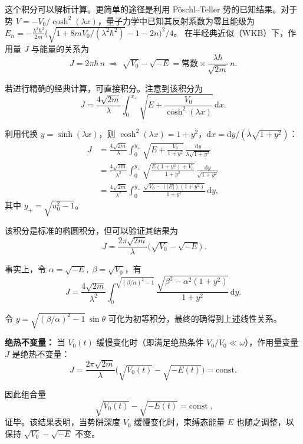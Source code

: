 \begin{question}
\begin{solution}
这个积分可以解析计算。更简单的途径是利用 P\"oschl--Teller 势的已知结果。对于势
\(V=-V_0/\cosh^2(\lambda x)\)，量子力学中已知其反射系数为零且能级为
\(E_n=-\frac{\lambda^2\hbar^2}{2m}\bigl(\sqrt{1+8mV_0/(\lambda^2\hbar^2)}-1-2n\bigr)^2/4\)。
在半经典近似（WKB）下，作用量 \(J\) 与能量的关系为
\[
J=2\pi\hbar\,n\;\Longrightarrow\;
\sqrt{V_0}-\sqrt{-E}=\text{常数}\times\frac{\lambda\hbar}{\sqrt{2m}}\,n .
\]

若进行精确的经典计算，可直接积分。注意到该积分为
\[
J=\frac{4\sqrt{2m}}{\lambda}\int_0^{x_+}\sqrt{E+\frac{V_0}{\cosh^2(\lambda x)}}\,\mathrm dx .
\]

利用代换 \(y=\sinh(\lambda x)\)，则 \(\cosh^2(\lambda x)=1+y^2\)，\(\mathrm dx=\mathrm dy/(\lambda\sqrt{1+y^2})\)：
\[
\begin{aligned}
J&=\frac{4\sqrt{2m}}{\lambda}\int_0^{y_+}
\sqrt{E+\frac{V_0}{1+y^2}}\,
\frac{\mathrm dy}{\lambda\sqrt{1+y^2}} \\[4pt]
&=\frac{4\sqrt{2m}}{\lambda^2}\int_0^{y_+}
\sqrt{\frac{E(1+y^2)+V_0}{1+y^2}}\,
\frac{\mathrm dy}{\sqrt{1+y^2}} \\[4pt]
&=\frac{4\sqrt{2m}}{\lambda^2}\int_0^{y_+}
\frac{\sqrt{V_0-(|E|)(1+y^2)}}{1+y^2}\,\mathrm dy,
\end{aligned}
\]
其中 \(y_+=\sqrt{u_0^2-1}\)。

该积分是标准的椭圆积分，但可以验证其结果为
\[
\boxed{\;J=\frac{2\pi\sqrt{2m}}{\lambda}\bigl(\sqrt{V_0}-\sqrt{-E}\bigr)\;}.
\]

事实上，令 \(\alpha=\sqrt{-E},\;\beta=\sqrt{V_0}\)，有
\[
J=\frac{4\sqrt{2m}}{\lambda^2}\int_0^{\sqrt{(\beta/\alpha)^2-1}}
\frac{\sqrt{\beta^2-\alpha^2(1+y^2)}}{1+y^2}\,\mathrm dy .
\]

令 \(y=\sqrt{(\beta/\alpha)^2-1}\,\sin\theta\) 可化为初等积分，最终的确得到上述线性关系。

\noindent\textbf{绝热不变量：} 当 \(V_0(t)\) 缓慢变化时（即满足绝热条件 \(\dot V_0/V_0\ll\omega\)），作用量变量 \(J\) 是绝热不变量：
\[
J=\frac{2\pi\sqrt{2m}}{\lambda}\bigl(\sqrt{V_0(t)}-\sqrt{-E(t)}\bigr)=\text{const}.
\]

因此组合量
\[
\boxed{\;\sqrt{V_0(t)}-\sqrt{-E(t)}=\text{const}\;},
\]
证毕。该结果表明，当势阱深度 \(V_0\) 缓慢变化时，束缚态能量 \(E\) 也随之调整，以保持 \(\sqrt{V_0}-\sqrt{-E}\) 不变。
\end{solution}
\end{question}
